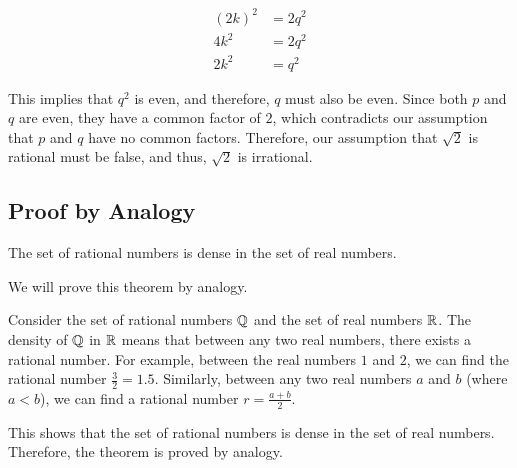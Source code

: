 \begin{align*}
{(2k)}^2 &= 2q^2\\	
4k^2 &= 2q^2\\
2k^2 &= q^2
\end{align*}

This implies that \( q^2 \) is even, and therefore, \( q \) must also be even.
Since both \( p \) and \( q \) are even, they have a common factor of \( 2 \), which contradicts our 
assumption that \( p \) and \( q \) have no common factors. Therefore, our assumption that 
\( \sqrt{2} \) is rational must be false, and thus, \( \sqrt{2} \) is irrational.

\QED

\subsection{Proof by Analogy}

The set of rational numbers is dense in the set of real numbers.

We will prove this theorem by analogy.
\vspace{\baselineskip}
	
Consider the set of rational numbers \( \mathbb{Q} \) and the set of real numbers \( \mathbb{R} \). 
The density of \( \mathbb{Q} \) in \( \mathbb{R} \) means that between any two real numbers, there exists a 
rational number. For example, between the real numbers \( 1 \) and \( 2 \), we can find the rational 
number \( \frac{3}{2} = 1.5 \). Similarly, between any two real numbers \( a \) and \( b \) (where 
\( a < b \)), we can find a rational number \( r = \frac{a + b}{2} \).
\vspace{\baselineskip}

This shows that the set of rational numbers is dense in the set of real numbers.
Therefore, the theorem is proved by analogy.

\QED


